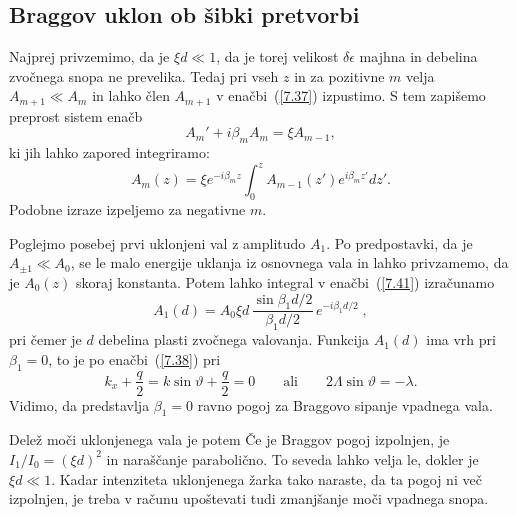 \subsection*{Braggov uklon ob šibki pretvorbi}
Najprej privzemimo, da je $\xi d\ll 1$, da je torej velikost $\delta \epsilon$
majhna in debelina zvočnega snopa ne prevelika. Tedaj pri vseh
$z$ in za pozitivne $m$ velja $A_{m+1}\ll A_{m}$ in lahko člen $A_{m+1}$
v enačbi~(\ref{7.37}) izpustimo. S tem zapišemo preprost sistem enačb
\begin{equation}
A_{m}'+i\beta_{m}A_{m}=\xi A_{m-1},
\label{7.40}
\end{equation}
 ki jih lahko zapored integriramo: 
\begin{equation}
A_{m}(z)=\xi e^{-i\beta_{m}z}\int_{0}^{z}A_{m-1}(z')
e^{i\beta_{m}z'}dz'.
\label{7.41}
\end{equation}
Podobne izraze izpeljemo za negativne $m$.

Poglejmo posebej prvi uklonjeni val z amplitudo $A_{1}$. Po predpostavki,
da je $A_{\pm1}\ll A_{0}$, se le malo energije uklanja iz osnovnega
vala in lahko privzamemo, da je $A_{0}(z)$ skoraj konstanta. 
Potem lahko integral v enačbi~(\ref{7.41})
izračunamo
\begin{equation}
A_{1}(d)=A_{0}\xi d\,\frac{\sin\beta_{1}d/2}{\beta_{1}d/2}\, e^{-i\beta_{1}d/2}\;,
\label{7.41a}
\end{equation}
pri čemer je $d$ debelina plasti zvočnega valovanja.
Funkcija $A_{1}(d)$ ima vrh pri $\beta_{1}=0$, to je po enačbi~(\ref{7.38}) pri 
\begin{equation}
k_x+ \frac{q}{2} = k \sin\vartheta + \frac{q}{2} = 0
\qquad \mathrm{ali} \qquad 
2\Lambda\sin\vartheta=-\lambda.
\label{7.43}
\end{equation}
Vidimo, da predstavlja $\beta_{1}=0$ ravno pogoj za Braggovo sipanje vpadnega
vala.

Delež moči uklonjenega vala je potem
Če je Braggov pogoj izpolnjen, je $I_{1}/I_{0}=(\xi d)^{2}$ in naraščanje parabolično. To seveda
lahko velja le, dokler je $\xi d\ll1$. Kadar intenziteta uklonjenega žarka
tako naraste, da ta pogoj ni več izpolnjen, je treba v računu upoštevati tudi 
zmanjšanje moči vpadnega snopa.

